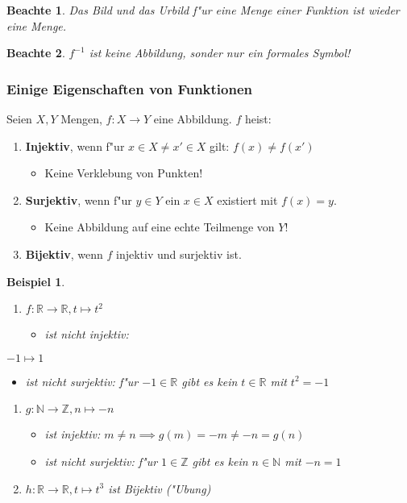\documentclass[11pt]{article}
\newtheorem{exa}{Beispiel}[section]
\newtheorem*{notte}{Beachte}
\begin{document}
\begin{notte}
Das Bild und das Urbild f"ur eine \emph{Menge} einer Funktion ist wieder eine \emph{Menge}.
\end{notte}


\begin{notte}
\(f^{-1}\) ist keine Abbildung, sonder nur ein formales Symbol!
\end{notte}

\subsubsection{Einige Eigenschaften von Funktionen}
\label{sec:org1909a84}
Seien \(X,Y\) Mengen, \(f: X\to Y\) eine Abbildung. \(f\) heist:
\begin{relation}
\begin{enumerate}
\item \textbf{Injektiv}, wenn f"ur \(x\in X\not = x' \in X\) gilt: \(f(x) \not = f(x')\)
\begin{itemize}
\item Keine Verklebung von Punkten!
\end{itemize}
\item \textbf{Surjektiv}, wenn f"ur \(y\in Y\) ein \(x\in X\) existiert mit \(f(x)=y\).
\begin{itemize}
\item Keine Abbildung auf eine echte Teilmenge von \(Y\)!
\end{itemize}
\item \textbf{Bijektiv}, wenn \(f\) injektiv und surjektiv ist.
\end{enumerate}
\end{relation}

\begin{exa}\
\begin{enumerate}
\item \(f: \mathbb{R} \to \mathbb{R}, t\mapsto t^2\) 
\begin{itemize}
\item ist nicht injektiv:
\end{itemize}
\end{enumerate}
\(-1\mapsto 1\)
\begin{itemize}
\item ist nicht surjektiv: f"ur \(-1\in \mathbb{R}\) gibt es kein \(t\in\mathbb{R}\)
mit \(t^2=-1\)
\end{itemize}
\begin{enumerate}
\item \(g: \mathbb{N}\to\mathbb{Z}, n\mapsto-n\)
\begin{itemize}
\item ist injektiv: \(m\ne n\implies g(m)=-m \ne -n = g(n)\)
\item ist nicht surjektiv: f"ur \(1\in \mathbb{Z}\) gibt es kein \(n\in \mathbb{N}\)
mit \(-n=1\)
\end{itemize}
\item \(h: \mathbb{R}\to\mathbb{R},t\mapsto t^3\) ist Bijektiv ("Ubung)
\end{enumerate}
\end{exa}
\end{document}
